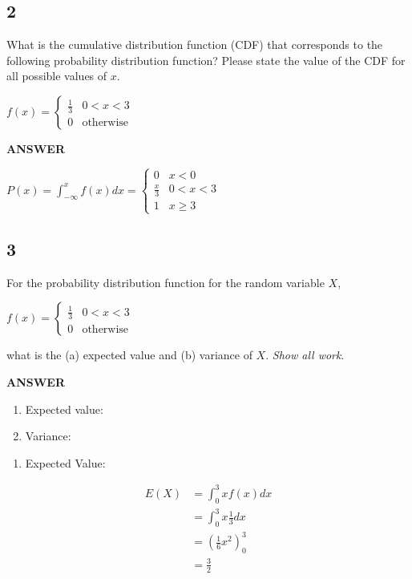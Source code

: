 \documentclass[11pt]{article}
\providecommand{\tightlist}{%
      \setlength{\itemsep}{0pt}\setlength{\parskip}{0pt}}
\begin{document}
    \subsection{2}\label{section}

What is the cumulative distribution function (CDF) that corresponds to
the following probability distribution function? Please state the value
of the CDF for all possible values of \(x\).

\(f(x) = \begin{cases}  \frac{1}{3} & 0 < x < 3 \\  0 & \text{otherwise}  \end{cases}\)

    \textbf{ANSWER}

    \(P(x)=\int_{-\infty}^{x} f(x) dx  = \begin{cases}  0 & x<0 \\  \frac{x}{3} & 0 < x < 3 \\  1 & x \geq 3  \end{cases}\)

    \subsection{3}\label{section}

For the probability distribution function for the random variable \(X\),

\(f(x) = \begin{cases}  \frac{1}{3} & 0 < x < 3 \\  0 & \text{otherwise}  \end{cases}\)

what is the (a) expected value and (b) variance of \(X\). \emph{Show all
work}.

    \textbf{ANSWER}

\begin{enumerate}
\def\labelenumi{(\alph{enumi})}
\item
  Expected value:
\item
  Variance:
\end{enumerate}

    \begin{enumerate}
\def\labelenumi{(\alph{enumi})}
\tightlist
\item
  Expected Value:
\end{enumerate}

\[
\begin{align}
E(X)&= \int_{0}^{3} x f(x) dx \\
    &=\int_{0}^{3} x \frac{1}{3} dx \\ 
    &=(\frac{1}{6} x^2)_{0}^{3}\\
    &=\frac{3}{2}
\end{align}
\]
\end{document}

